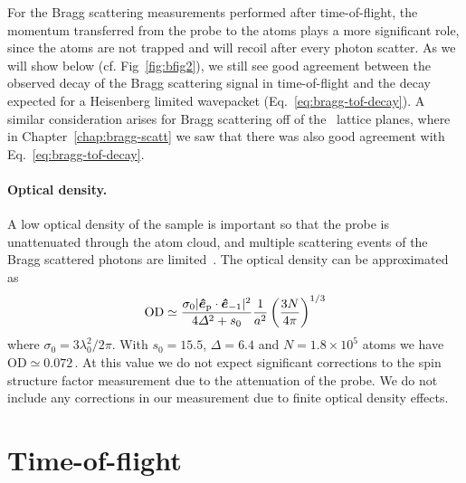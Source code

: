 For the Bragg scattering measurements performed after time-of-flight, the
momentum transferred from the probe to the atoms plays a more significant role,
since the atoms are not trapped and will recoil after every photon scatter.  As
we will show below (cf. Fig~\ref{fig:bfig2}), we still see good agreement
between the observed decay of the Bragg scattering signal in time-of-flight and
the decay expected for a Heisenberg limited wavepacket
(Eq.~\ref{eq:bragg-tof-decay}).   A similar consideration arises for Bragg
scattering off of the \zoz\ lattice planes,  where in
Chapter~\ref{chap:bragg-scatt} we saw that there was also good agreement with
Eq.~\ref{eq:bragg-tof-decay}.  


\paragraph{Optical density.} A low optical density of the sample is important
so that the probe is unattenuated through the atom cloud, and multiple
scattering events of the Bragg scattered photons are
limited~\cite{Ted2010}.  The optical density  can be approximated as
\begin{equation*}
   \text{OD}
  \simeq
    \frac{ \sigma_{0} | \bm{\hat{e}}_{\text{p}} \cdot \bm{\hat{e}}_{-1} |^{2}}
         {  4 \Delta^{2} + s_{0} }
    \frac{1}{a^{2}}
    \left(\frac{ 3N}{4\pi} \right)^{1/3}
\end{equation*}
where $\sigma_{0}=3\lambda_{0}^{2}/2\pi$.  With $s_{0}=15.5$,
$\Delta=6.4$  and $N=1.8\times10^{5}$ atoms we have
$\text{OD}\simeq0.072$\,.  At this value we do not expect significant
corrections to the spin structure factor measurement due to the attenuation of
the probe.  We do not include any corrections in our measurement due to
finite optical density effects. 


\section{Time-of-flight}
 
